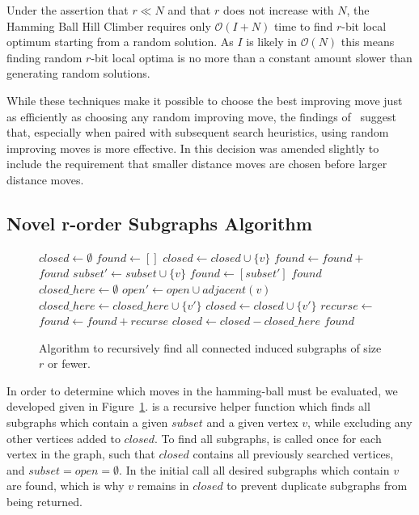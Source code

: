 \documentclass{sig-alternate}
\newcommand{\BigO}[1]{$\mathcal{O}{(#1)}$}
\begin{document}
Under the assertion that $r \ll N$ and that $r$ does not increase with $N$, the Hamming
Ball Hill Climber requires only \BigO{I+N} time to find $r$-bit local optimum starting
from a random solution. As $I$ is likely in \BigO{N} this means finding random $r$-bit local optima
is no more than a constant amount slower than generating random solutions.

While these techniques make it possible to choose the best improving move just as efficiently
as choosing any random improving move, the findings of~\cite{whitley:2013:greedy} suggest that,
especially when paired with subsequent search heuristics, using random improving moves is more effective.
In \cite{chicano:2014:ball} this decision was amended slightly to include the requirement that smaller
distance moves are chosen before larger distance moves.

\subsection{Novel r-order Subgraphs Algorithm}
\begin{figure}
  \begin{algorithmic}[1]
    \State $closed \leftarrow \emptyset$
    \State $found \leftarrow []$
      \State $closed \leftarrow closed \cup \{v\}$
      \State $found \leftarrow found + $
    \EndFor
    \State \Return $found$
  \EndProcedure
    \State $subset' \leftarrow subset \cup \{v\}$
    \State $found \leftarrow [subset']$
      \Return $found$
    \EndIf
    \State $closed\_here \leftarrow \emptyset$
    \State $open' \leftarrow open \cup adjacent(v)$
        \State $closed\_here \leftarrow closed\_here \cup \{v'\}$
        \State $closed \leftarrow closed \cup \{v'\}$
        \State $recurse \leftarrow $
        \State $found \leftarrow found + recurse$
    \EndFor
    \State $closed \leftarrow closed - closed\_here$
    \State \Return $found$
  \EndProcedure
\end{algorithmic}
  \caption{Algorithm to recursively find all connected induced subgraphs of size $r$ or fewer.}
  \label{fig-connected-subgraphs}
\end{figure}

In order to determine which moves in the hamming-ball must be evaluated,
we developed  given in Figure~\ref{fig-connected-subgraphs}.
 is a recursive helper function which finds all subgraphs
which contain a given $subset$ and a given vertex $v$, while excluding
any other vertices added to $closed$. To find all subgraphs, 
is called once for each vertex in the graph, such that $closed$ contains
all previously searched vertices, and $subset=open=\emptyset$. In the initial
call all desired subgraphs which contain $v$ are found, which is why $v$ remains
in $closed$ to prevent duplicate subgraphs from being returned.
\end{document}
